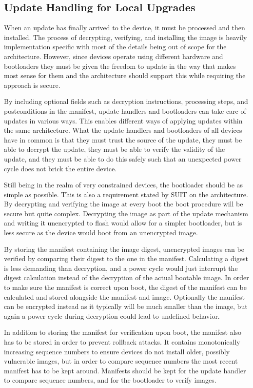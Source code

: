 \documentclass[0-thesis.tex]{subfiles}
\begin{document}
\subsection{Update Handling for Local Upgrades}
\label{ssec:upgrading}
When an update has finally arrived to the device, it must be processed and then installed.
The process of decrypting, verifying, and installing the image is heavily implementation
specific with most of the details being out of scope for the architecture. However, since
devices operate using different hardware and bootloaders they must be given the freedom to
update in the way that makes most sense for them and the architecture should support this
while requiring the approach is secure.

By including optional fields such as decryption instructions, processing steps, and
postconditions in the manifest, update handlers and bootloaders can take care of updates
in various ways. This enables different ways of applying updates within the same
architecture. What the update handlers and bootloaders of all devices have in common is
that they must trust the source of the update, they must be able to decrypt the update,
they must be able to verify the validity of the update, and they must be able to do this
safely such that an unexpected power cycle does not brick the entire device.

Still being in the realm of very constrained devices, the bootloader should be as simple
as possible. This is also a requirement stated by SUIT on the architecture. By decrypting
and verifying the image at every boot the boot procedure will be secure but quite complex.
Decrypting the image as part of the update mechanism and writing it unencrypted to flash
would allow for a simpler bootloader, but is less secure as the device would boot from an
unencrypted image.

By storing the manifest containing the image digest, unencrypted images can be verified by
comparing their digest to the one in the manifest. Calculating a digest is less demanding
than decryption, and a power cycle would just interrupt the digest calculation instead of
the decryption of the actual bootable image. In order to make sure the manifest is correct
upon boot, the digest of the manifest can be calculated and stored alongside the manifest
and image. Optionally the manifest can be encrypted instead as it typically will be much
smaller than the image, but again a power cycle during decryption could lead to undefined
behavior.

In addition to storing the manifest for verification upon boot, the manifest also has to
be stored in order to prevent rollback attacks. It contains monotonically increasing
sequence numbers to ensure devices do not install older, possibly vulnerable images, but
in order to compare sequence numbers the most recent manifest has to be kept around.
Manifests should be kept for the update handler to compare sequence numbers, and for the
bootloader to verify images.
\end{document}
